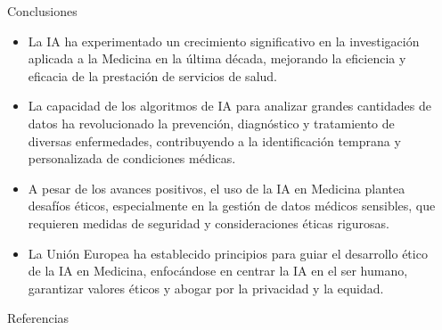 \documentclass[final]{beamer}
\newlength{\sepwidth}
\newlength{\colwidth}
\newcommand{\separatorcolumn}{\begin{column}{\sepwidth}\end{column}}
\begin{document}
\begin{frame}[t]
\begin{columns}[t]
\begin{column}{\colwidth}
\begin{block}{Conclusiones}
\begin{itemize}
    \item La IA ha experimentado un crecimiento significativo en la investigación aplicada a la Medicina en la última década, mejorando la eficiencia y eficacia de la prestación de servicios de salud. 
    \item La capacidad de los algoritmos de IA para analizar grandes cantidades de datos ha revolucionado la prevención, diagnóstico y tratamiento de diversas enfermedades, contribuyendo a la identificación temprana y personalizada de condiciones médicas.
    \item A pesar de los avances positivos, el uso de la IA en Medicina plantea desafíos éticos, especialmente en la gestión de datos médicos sensibles, que requieren medidas de seguridad y consideraciones éticas rigurosas.
    \item La Unión Europea ha establecido principios para guiar el desarrollo ético de la IA en Medicina, enfocándose en centrar la IA en el ser humano, garantizar valores éticos y abogar por la privacidad y la equidad.
\end{itemize}
  
  \end{block}

  \begin{block}{Referencias}

    \nocite{*}
    \footnotesize{}
    \printbibliography
    

  \end{block}

\end{column}

\separatorcolumn
\end{columns}
\end{frame}
\end{document}
